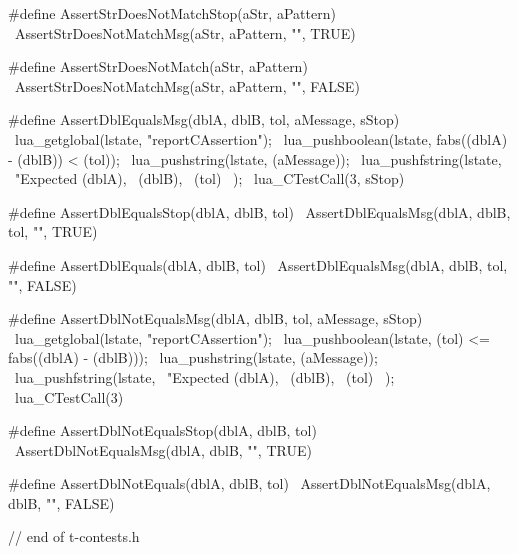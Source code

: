 #define AssertStrDoesNotMatchStop(aStr, aPattern)    \
  AssertStrDoesNotMatchMsg(aStr, aPattern, "", TRUE)
  
#define AssertStrDoesNotMatch(aStr, aPattern)         \
  AssertStrDoesNotMatchMsg(aStr, aPattern, "", FALSE)
\stopCHeader

\stopTestSuite

\startTestSuite[assertDblEquals]

\startCHeader
#define AssertDblEqualsMsg(dblA, dblB, tol, aMessage, sStop) \
  lua_getglobal(lstate, "reportCAssertion");                 \
  lua_pushboolean(lstate, fabs((dblA) - (dblB)) < (tol));    \
  lua_pushstring(lstate, (aMessage));                        \
  lua_pushfstring(lstate,                                    \
      "Expected %
      (dblA),                                                \
      (dblB),                                                \
      (tol)                                                  \
    );                                                       \
  lua_CTestCall(3, sStop)

#define AssertDblEqualsStop(dblA, dblB, tol)    \
  AssertDblEqualsMsg(dblA, dblB, tol, "", TRUE)

#define AssertDblEquals(dblA, dblB, tol)         \
  AssertDblEqualsMsg(dblA, dblB, tol, "", FALSE)
\stopCHeader

\stopTestSuite

\startTestSuite[assertDblNotEqals]

\startCHeader
#define AssertDblNotEqualsMsg(dblA, dblB, tol, aMessage, sStop)  \
  lua_getglobal(lstate, "reportCAssertion");                     \
  lua_pushboolean(lstate, (tol) <= fabs((dblA) - (dblB)));       \
  lua_pushstring(lstate, (aMessage));                            \
  lua_pushfstring(lstate,                                        \
      "Expected %
      (dblA),                                                    \
      (dblB),                                                    \
      (tol)                                                      \
    );                                                           \
  lua_CTestCall(3)

#define AssertDblNotEqualsStop(dblA, dblB, tol) \
  AssertDblNotEqualsMsg(dblA, dblB, "", TRUE)

#define AssertDblNotEquals(dblA, dblB, tol)    \
  AssertDblNotEqualsMsg(dblA, dblB, "", FALSE)

// end of t-contests.h
\stopCHeader

\stopTestSuite
